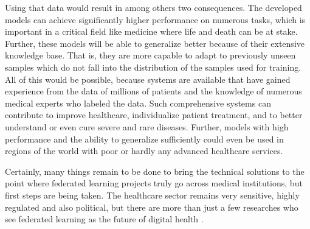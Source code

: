 Using that data would result in among others two consequences.
The developed models can achieve significantly higher performance on numerous tasks, which is important in a critical field like medicine where life and death can be at stake.
Further, these models will be able to generalize better because of their extensive knowledge base. That is, they are more capable to adapt to previously unseen samples which do not fall into the distribution of the samples used for training. 
All of this would be possible, because systems are available that have gained experience from the data of millions of patients and the knowledge of numerous medical experts who labeled the data.
Such comprehensive systems can contribute to improve healthcare, individualize patient treatment, and to better understand or even cure severe and rare diseases.
Further, models with high performance and the ability to generalize sufficiently could even be used in regions of the world with poor or hardly any advanced healthcare services.

Certainly, many things remain to be done to bring the technical solutions to the point where federated learning projects truly go across medical institutions, but first steps are being taken. The healthcare sector remains very sensitive, highly regulated and also political, but there are more than just a few researches who see federated learning as the future of digital health \citep{Rieke2020TheLearning}.




